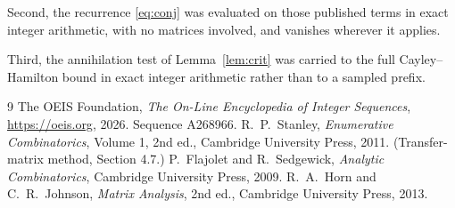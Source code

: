 \documentclass[11pt,a4paper]{article}
\theoremstyle{plain}
\theoremstyle{definition}
\begin{document}
Second, the recurrence \eqref{eq:conj} was evaluated on those published terms in exact
integer arithmetic, with no matrices involved, and vanishes wherever it applies.

Third, the annihilation test of Lemma~\ref{lem:crit} was carried to the full
Cayley--Hamilton bound in exact integer arithmetic rather than to a sampled prefix.

\begin{thebibliography}{9}
 The OEIS Foundation, \emph{The On-Line Encyclopedia of Integer
Sequences}, \url{https://oeis.org}, 2026. Sequence A268966.
 R.~P.~Stanley, \emph{Enumerative Combinatorics}, Volume 1, 2nd ed.,
Cambridge University Press, 2011. (Transfer-matrix method, Section 4.7.)
 P.~Flajolet and R.~Sedgewick, \emph{Analytic Combinatorics}, Cambridge
University Press, 2009.
 R.~A.~Horn and C.~R.~Johnson, \emph{Matrix Analysis}, 2nd ed., Cambridge
University Press, 2013.
\end{thebibliography}
\end{document}
